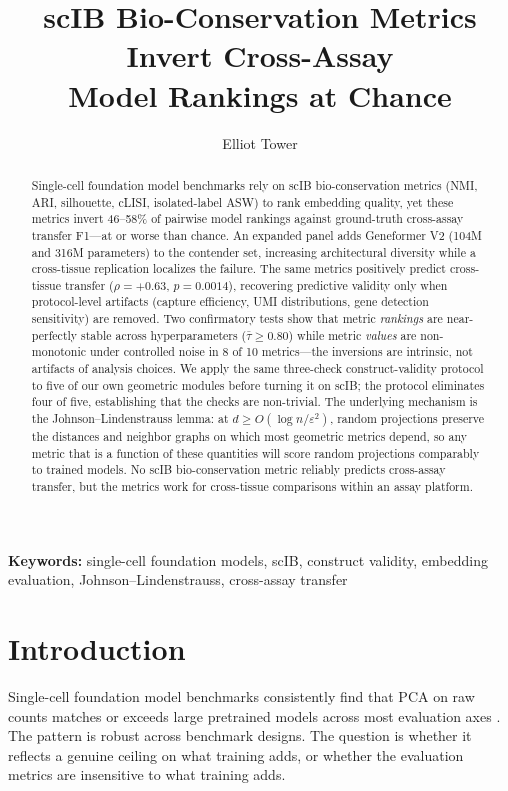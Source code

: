 \documentclass[11pt]{article}
\title{scIB Bio-Conservation Metrics Invert Cross-Assay\\Model Rankings at Chance}
\author{Elliot Tower}
\affil{Independent Researcher \\ \texttt{elliot@elliottower.ai}}
\date{}
\begin{document}
\linenumbers
\maketitle

\begin{abstract}
Single-cell foundation model benchmarks rely on scIB bio-conservation metrics (NMI, ARI, silhouette, cLISI, isolated-label ASW) to rank embedding quality, yet these metrics invert 46--58\% of pairwise model rankings against ground-truth cross-assay transfer F1---at or worse than chance. An expanded panel adds Geneformer V2 (104M and 316M parameters) to the contender set, increasing architectural diversity while a cross-tissue replication localizes the failure. The same metrics positively predict cross-tissue transfer ($\rho = +0.63$, $p = 0.0014$), recovering predictive validity only when protocol-level artifacts (capture efficiency, UMI distributions, gene detection sensitivity) are removed. Two confirmatory tests show that metric \emph{rankings} are near-perfectly stable across hyperparameters ($\bar{\tau} \geq 0.80$) while metric \emph{values} are non-monotonic under controlled noise in 8 of 10 metrics---the inversions are intrinsic, not artifacts of analysis choices. We apply the same three-check construct-validity protocol to five of our own geometric modules before turning it on scIB; the protocol eliminates four of five, establishing that the checks are non-trivial. The underlying mechanism is the Johnson--Lindenstrauss lemma: at $d \geq O(\log n / \varepsilon^2)$, random projections preserve the distances and neighbor graphs on which most geometric metrics depend, so any metric that is a function of these quantities will score random projections comparably to trained models. No scIB bio-conservation metric reliably predicts cross-assay transfer, but the metrics work for cross-tissue comparisons within an assay platform.
\end{abstract}

\noindent\textbf{Keywords:} single-cell foundation models, scIB, construct validity, embedding evaluation, Johnson--Lindenstrauss, cross-assay transfer


\section{Introduction}
\label{sec:intro}

Single-cell foundation model benchmarks consistently find that PCA on raw counts matches or exceeds large pretrained models across most evaluation axes \citep{wu2025scfm, vcbench2026, unifiedscfm2026, cellxgeneintegration2026}. The pattern is robust across benchmark designs. The question is whether it reflects a genuine ceiling on what training adds, or whether the evaluation metrics are insensitive to what training adds.
\end{document}
